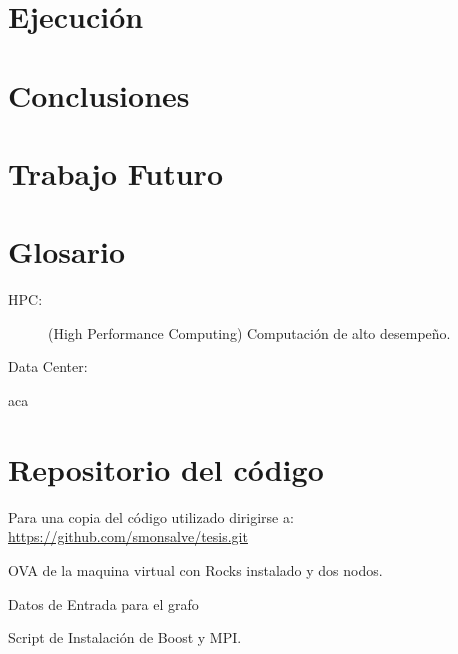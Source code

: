 \documentclass[twoside,letterpaper,12pt]{report}
\begin{document}
\chapter{Ejecución}


\chapter{Conclusiones}


\chapter{Trabajo Futuro}


\chapter{Glosario}
	\label{chapGlosario}

	\begin{description}
		\item[HPC:] (High Performance Computing) Computación de alto desempeño.
		\item[Data Center:]
	\end{description}

\newpage



	
	aca
	\cite{czarnecki2000generative}
	\cite{wwwBoost}
	\cite{stroustrup2013c++}
	\cite{andrei2001modern}
	\cite{Wall2000}
	\cite{Boost}
	\cite{Karniadakis}
	\cite{Kernighan1988}

\newpage

\appendix

\chapter{Repositorio del código}

	Para una copia del código utilizado dirigirse a: \url{https://github.com/smonsalve/tesis.git}

	OVA de la maquina virtual con Rocks instalado y dos nodos.

	Datos de Entrada para el grafo

			

	Script de Instalación de Boost y MPI.
\end{document}
